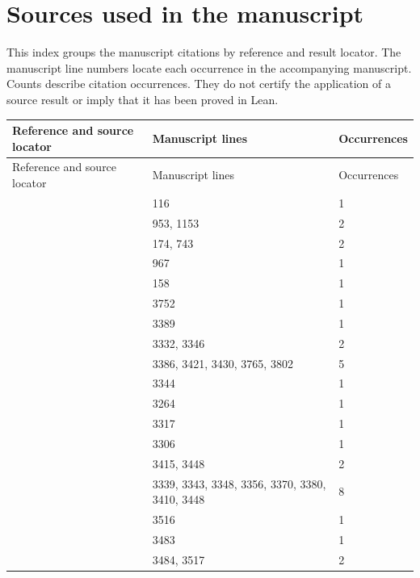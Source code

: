 \chapter{Sources used in the manuscript}
\label{chap:current-source-index}
This index groups the manuscript citations by reference and result locator.
The manuscript line numbers locate each occurrence in the accompanying manuscript.
Counts describe citation occurrences. They do not certify the application
of a source result or imply that it has been proved in Lean.
\small
\begin{longtable}{@{}p{}p{}p{}@{}}
\toprule Reference and source locator & Manuscript lines & Occurrences \\
\midrule\endfirsthead
\toprule Reference and source locator & Manuscript lines & Occurrences \\
\midrule\endhead
\bottomrule\endfoot
\cite{Alperin1987} & 116 & 1 \\
\cite[(6D)]{An1993} & 953, 1153 & 2 \\
\cite[p.~190]{An1993} & 174, 743 & 2 \\
\cite[p.~198]{An1993} & 967 & 1 \\
\cite{An1994} & 158 & 1 \\
\cite{AnCannonOBrienUngerFi24} & 3752 & 1 \\
\cite[Lemma~4.2(c) and Theorem~4.3]{AnCannonOBrienUngerFi24} & 3389 & 1 \\
\cite[Lemma~4.2(d)]{AnCannonOBrienUngerFi24} & 3332, 3346 & 2 \\
\cite[Proposition~4.1 and Table~1]{AnCannonOBrienUngerFi24} & 3386, 3421, 3430, 3765, 3802 & 5 \\
\cite[Table~2]{AnCannonOBrienUngerFi24} & 3344 & 1 \\
\cite[Theorem~4.3]{AnCannonOBrienUngerFi24} & 3264 & 1 \\
\cite{AnDietrich2012} & 3317 & 1 \\
\cite[Lemma~4.7]{AnDietrich2012} & 3306 & 1 \\
\cite[Section~4.3.4]{AnDietrich2012} & 3415, 3448 & 2 \\
\cite[Table~8]{AnDietrich2012} & 3339, 3343, 3348, 3356, 3370, 3380, 3410, 3448 & 8 \\
\cite[proof of Theorem~4.2 and Table~17]{AnDietrich2012} & 3516 & 1 \\
\cite[proof of Theorem~4.2 and Table~2]{AnDietrich2012} & 3483 & 1 \\
\cite{AnDietrichErratum} & 3484, 3517 & 2 \\

\end{longtable}
